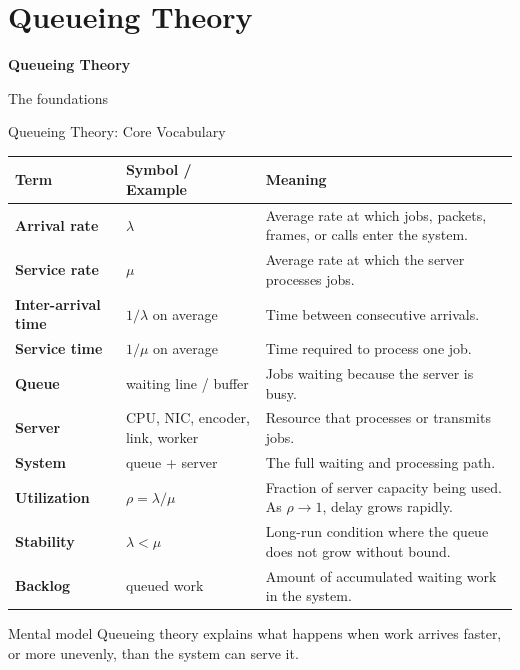 \documentclass[aspectratio=169]{beamer}
\begin{document}
\section{Queueing Theory}

\begin{frame}
    \centering
    \vfill

    {\Huge \textbf{Queueing Theory}}

    \vspace{0.4cm}

    {\Large The foundations}

    \vfill
\end{frame}









\begin{frame}{Queueing Theory: Core Vocabulary}
\scriptsize

\begin{tabular}{p{2.3cm} p{3.0cm} p{6.6cm}}
\toprule
\textbf{Term} & \textbf{Symbol / Example} & \textbf{Meaning} \\
\midrule
\textbf{Arrival rate} & $\lambda$ & Average rate at which jobs, packets, frames, or calls enter the system. \\
\textbf{Service rate} & $\mu$ & Average rate at which the server processes jobs. \\
\textbf{Inter-arrival time} & $1/\lambda$ on average & Time between consecutive arrivals. \\
\textbf{Service time} & $1/\mu$ on average & Time required to process one job. \\
\textbf{Queue} & waiting line / buffer & Jobs waiting because the server is busy. \\
\textbf{Server} & CPU, NIC, encoder, link, worker & Resource that processes or transmits jobs. \\
\textbf{System} & queue + server & The full waiting and processing path. \\
\textbf{Utilization} & $\rho = \lambda / \mu$ & Fraction of server capacity being used. As $\rho \rightarrow 1$, delay grows rapidly. \\
\textbf{Stability} & $\lambda < \mu$ & Long-run condition where the queue does not grow without bound. \\
\textbf{Backlog} & queued work & Amount of accumulated waiting work in the system. \\
\bottomrule
\end{tabular}

\vspace{0.15cm}

\begin{block}{Mental model}
Queueing theory explains what happens when work arrives faster, or more unevenly, than the system can serve it.
\end{block}

\end{frame}
\end{document}
